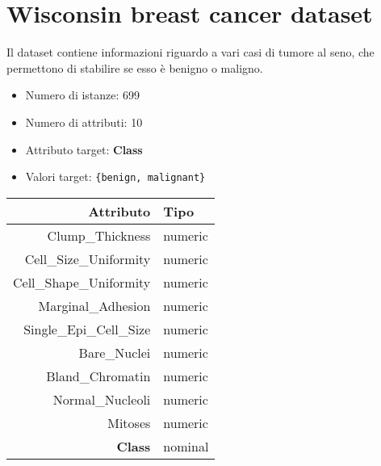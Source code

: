 \pagebreak

\section{Wisconsin breast cancer dataset}

Il dataset contiene informazioni riguardo a vari casi di tumore al seno, che permettono di stabilire se esso è benigno o maligno.


\begin{itemize}
	\item Numero di istanze: 699
	\item Numero di attributi: 10
	\item Attributo target: \textbf{Class}
	\item Valori target: \texttt{\{benign, malignant\}}
\end{itemize}


\begin{table}[!htb]
	\centering
	\begin{tabular}{|r|l|}
		\hline
		Attributo & Tipo \\ 
		\hline
		Clump\_Thickness & numeric \\ 
		Cell\_Size\_Uniformity & numeric \\ 
		Cell\_Shape\_Uniformity & numeric \\ 
		Marginal\_Adhesion & numeric \\ 
		Single\_Epi\_Cell\_Size & numeric \\ 
		Bare\_Nuclei & numeric \\ 
		Bland\_Chromatin & numeric \\ 
		Normal\_Nucleoli & numeric \\ 
		Mitoses & numeric \\ 
		\textbf{Class} & nominal \\ 
		\hline
	\end{tabular}
\end{table}
